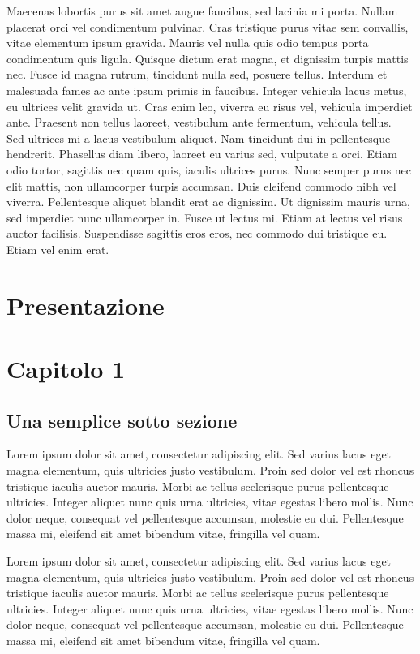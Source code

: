 \documentclass[10pt]{article}
\begin{document}
Maecenas lobortis purus sit amet augue faucibus, sed lacinia mi porta. Nullam placerat orci vel condimentum pulvinar. Cras tristique purus vitae sem convallis, vitae elementum ipsum gravida. Mauris vel nulla quis odio tempus porta condimentum quis ligula. Quisque dictum erat magna, et dignissim turpis mattis nec. Fusce id magna rutrum, tincidunt nulla sed, posuere tellus. Interdum et malesuada fames ac ante ipsum primis in faucibus. Integer vehicula lacus metus, eu ultrices velit gravida ut. Cras enim leo, viverra eu risus vel, vehicula imperdiet ante. Praesent non tellus laoreet, vestibulum ante fermentum, vehicula tellus.\\

Sed ultrices mi a lacus vestibulum aliquet. Nam tincidunt dui in pellentesque hendrerit. Phasellus diam libero, laoreet eu varius sed, vulputate a orci. Etiam odio tortor, sagittis nec quam quis, iaculis ultrices purus. Nunc semper purus nec elit mattis, non ullamcorper turpis accumsan. Duis eleifend commodo nibh vel viverra. Pellentesque aliquet blandit erat ac dignissim. Ut dignissim mauris urna, sed imperdiet nunc ullamcorper in. Fusce ut lectus mi. Etiam at lectus vel risus auctor facilisis. Suspendisse sagittis eros eros, nec commodo dui tristique eu. Etiam vel enim erat.
\section{Presentazione}

\section{Capitolo 1}

\subsection{Una semplice sotto sezione}
Lorem ipsum dolor sit amet, consectetur adipiscing elit. Sed varius lacus eget magna elementum, quis ultricies justo vestibulum. Proin sed dolor vel est rhoncus tristique iaculis auctor mauris. Morbi ac tellus scelerisque purus pellentesque ultricies. Integer aliquet nunc quis urna ultricies, vitae egestas libero mollis. Nunc dolor neque, consequat vel pellentesque accumsan, molestie eu dui. Pellentesque massa mi, eleifend sit amet bibendum vitae, fringilla vel quam.

Lorem ipsum dolor sit amet, consectetur adipiscing elit. Sed varius lacus eget magna elementum, quis ultricies justo vestibulum. Proin sed dolor vel est rhoncus tristique iaculis auctor mauris. Morbi ac tellus scelerisque purus pellentesque ultricies. Integer aliquet nunc quis urna ultricies, vitae egestas libero mollis. Nunc dolor neque, consequat vel pellentesque accumsan, molestie eu dui. Pellentesque massa mi, eleifend sit amet bibendum vitae, fringilla vel quam.
\end{document}
